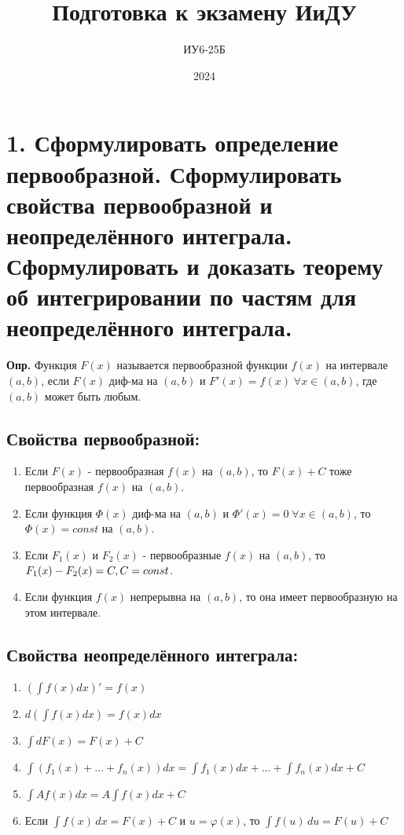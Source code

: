 \documentclass[11pt]{article}
\title{Подготовка к экзамену ИиДУ}
\author{ИУ6-25Б}
\date{2024}
\begin{document}
\maketitle

\section*{1. Сформулировать определение первообразной. Сформулировать свойства первообразной и неопределённого интеграла. Сформулировать и доказать теорему об интегрировании по частям для неопределённого интеграла.}
\textbf{Опр.} Функция \(F(x)\) называется первообразной функции \(f(x)\) на интервале \((a, b)\), если \(F(x)\) диф-ма на \((a, b)\) и \(F'(x)=f(x) \; \forall x \in (a, b)\), где \((a, b)\) может быть любым.
\subsection*{Свойства первообразной:}
\begin{enumerate}
\item Если \(F(x)\) - первообразная \(f(x)\) на \((a, b)\), то \(F(x) + C\) тоже первообразная \(f(x)\) на \((a, b)\).
\item Если функция \(\Phi(x)\) диф-ма на \((a, b)\) и \(\Phi'(x) = 0 \; \forall x\in (a, b)\), то \(\Phi(x) = const\) на \((a, b)\).
\item Если \(F_1(x)\) и \(F_2(x)\) - первообразные \(f(x)\) на \((a, b)\), то \(F_1(x) - F_2(x) = C,\space C = const\).
\item Если функция \(f(x)\) непрерывна на \((a, b)\), то она имеет первообразную на этом интервале.
\end{enumerate}

\subsection*{Свойства неопределённого интеграла:}
\begin{enumerate}
\item \((\int f(x)dx)'=f(x)\)
\item \(d(\int f(x)dx)=f(x)dx\)
\item \(\int dF(x) = F(x) + C\)
\item \(\int (f_1(x) + ... + f_n(x))dx = \int f_1(x)dx + ... + \int f_n(x)dx + C\)
\item \(\int Af(x)dx = A\int f(x)dx + C\)
\item Если $\int f(x) \, dx = F(x) + C$ и $u = \varphi(x)$, то $\int f(u) \, du = F(u) + C$
\end{enumerate}
\end{document}
